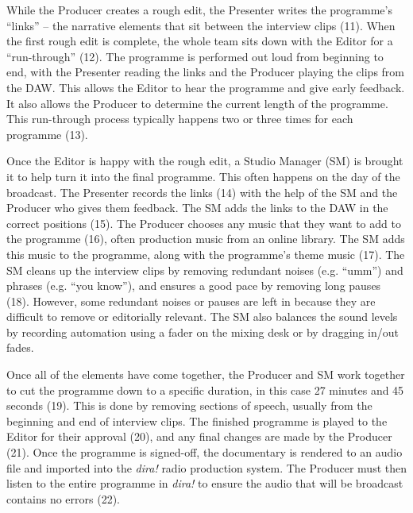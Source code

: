 While the Producer creates a rough edit, the Presenter writes the programme's ``links'' -- the narrative elements that
sit between the interview clips (11). When the first rough edit is complete, the whole team sits down with the Editor
for a ``run-through'' (12). The programme is performed out loud from beginning to end, with the Presenter reading the
links and the Producer playing the clips from the DAW. This allows the Editor to hear the programme and give early
feedback. It also allows the Producer to determine the current length of the programme.  This run-through process
typically happens two or three times for each programme (13).

Once the Editor is happy with the rough edit, a Studio Manager (SM) is brought it to help turn it into the final
programme.  This often happens on the day of the broadcast.  The Presenter records the links (14) with the help of the
SM and the Producer who gives them feedback.  The SM adds the links to the DAW in the correct positions (15). The
Producer chooses any music that they want to add to the programme (16), often production music from an online library.
The SM adds this music to the programme, along with the programme's theme music (17).  The SM cleans up the interview
clips by removing redundant noises (e.g. ``umm'') and phrases (e.g. ``you know''), and ensures a good pace by removing
long pauses (18). However, some redundant noises or pauses are left in because they are difficult to remove or
editorially relevant.  The SM also balances the sound levels by recording automation using a fader on the mixing desk
or by dragging in/out fades. 

Once all of the elements have come together, the Producer and SM work together to cut the programme down to a specific
duration, in this case 27 minutes and 45 seconds (19). This is done by removing sections of speech, usually from the
beginning and end of interview clips.  The finished programme is played to the Editor for their approval (20), and any
final changes are made by the Producer (21).  Once the programme is signed-off, the documentary is rendered to an audio
file and imported into the \textit{dira!} radio production system. The Producer must then listen to the entire
programme in \textit{dira!} to ensure the audio that will be broadcast contains no errors (22).


